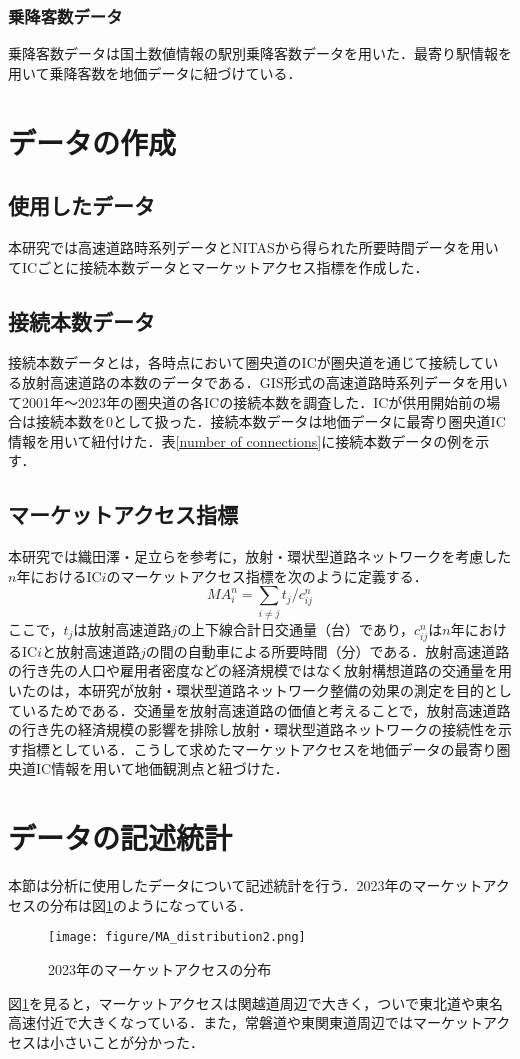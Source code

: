 \subsubsection{乗降客数データ}
乗降客数データは国土数値情報の駅別乗降客数データを用いた．最寄り駅情報を用いて乗降客数を地価データに紐づけている．
\newpage
\section{データの作成}
\subsection{使用したデータ}
本研究では高速道路時系列データとNITASから得られた所要時間データを用いてICごとに接続本数データとマーケットアクセス指標を作成した．

\subsection{接続本数データ}
接続本数データとは，各時点において圏央道のICが圏央道を通じて接続している放射高速道路の本数のデータである．GIS形式の高速道路時系列データを用いて2001年〜2023年の圏央道の各ICの接続本数を調査した．ICが供用開始前の場合は接続本数を0として扱った．接続本数データは地価データに最寄り圏央道IC情報を用いて紐付けた．表\ref{number of connections}に接続本数データの例を示す．



\subsection{マーケットアクセス指標}
本研究では織田澤・足立らを参考に，放射・環状型道路ネットワークを考慮した$n$年におけるIC$i$のマーケットアクセス指標を次のように定義する．
\[{MA}^{n}_{i} = \sum_{i \neq j}{t_{j}/c^{n}_{ij}}\]
ここで，$t_{j}$は放射高速道路$j$の上下線合計日交通量（台）であり，$c^{n}_{ij}$は$n$年におけるIC$i$と放射高速道路$j$の間の自動車による所要時間（分）である．放射高速道路の行き先の人口や雇用者密度などの経済規模ではなく放射構想道路の交通量を用いたのは，本研究が放射・環状型道路ネットワーク整備の効果の測定を目的としているためである．交通量を放射高速道路の価値と考えることで，放射高速道路の行き先の経済規模の影響を排除し放射・環状型道路ネットワークの接続性を示す指標としている．こうして求めたマーケットアクセスを地価データの最寄り圏央道IC情報を用いて地価観測点と紐づけた．

\section{データの記述統計}
 本節は分析に使用したデータについて記述統計を行う．2023年のマーケットアクセスの分布は図\ref{MA_2023_distribution}のようになっている．
 \begin{figure}[H]
  \centering
  \texttt{[image: figure/MA\_distribution2.png]}
  \caption{2023年のマーケットアクセスの分布}
  \label{MA_2023_distribution}
\end{figure}
図\ref{MA_2023_distribution}を見ると，マーケットアクセスは関越道周辺で大きく，ついで東北道や東名高速付近で大きくなっている．また，常磐道や東関東道周辺ではマーケットアクセスは小さいことが分かった．


